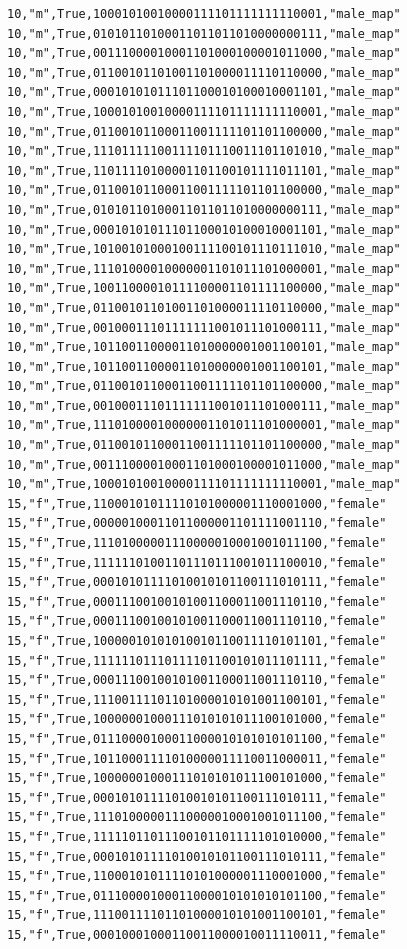 \documentclass[authoryearcitations]{UoYCSproject}
\begin{document}
\begin{framed}
\begin{verbatim}
10,"m",True,10001010010000111101111111110001,"male_map"
10,"m",True,01010110100011011011010000000111,"male_map"
10,"m",True,00111000010001101000100001011000,"male_map"
10,"m",True,01100101101001101000011110110000,"male_map"
10,"m",True,00010101011101100010100010001101,"male_map"
10,"m",True,10001010010000111101111111110001,"male_map"
10,"m",True,01100101100011001111101101100000,"male_map"
10,"m",True,11101111100111101110011101101010,"male_map"
10,"m",True,11011110100001101100101111011101,"male_map"
10,"m",True,01100101100011001111101101100000,"male_map"
10,"m",True,01010110100011011011010000000111,"male_map"
10,"m",True,00010101011101100010100010001101,"male_map"
10,"m",True,10100101000100111100101110111010,"male_map"
10,"m",True,11101000010000001101011101000001,"male_map"
10,"m",True,10011000010111100001101111100000,"male_map"
10,"m",True,01100101101001101000011110110000,"male_map"
10,"m",True,00100011101111111001011101000111,"male_map"
10,"m",True,10110011000011010000001001100101,"male_map"
10,"m",True,10110011000011010000001001100101,"male_map"
10,"m",True,01100101100011001111101101100000,"male_map"
10,"m",True,00100011101111111001011101000111,"male_map"
10,"m",True,11101000010000001101011101000001,"male_map"
10,"m",True,01100101100011001111101101100000,"male_map"
10,"m",True,00111000010001101000100001011000,"male_map"
10,"m",True,10001010010000111101111111110001,"male_map"
15,"f",True,11000101011110101000001110001000,"female"
15,"f",True,00000100011011000001101111001110,"female"
15,"f",True,11101000001110000010001001011100,"female"
15,"f",True,11111101001101110111001011100010,"female"
15,"f",True,00010101111010010101100111010111,"female"
15,"f",True,00011100100101001100011001110110,"female"
15,"f",True,00011100100101001100011001110110,"female"
15,"f",True,10000010101010010110011110101101,"female"
15,"f",True,11111101110111101100101011101111,"female"
15,"f",True,00011100100101001100011001110110,"female"
15,"f",True,11100111101101000010101001100101,"female"
15,"f",True,10000001000111010101011100101000,"female"
15,"f",True,01110000100011000010101010101100,"female"
15,"f",True,10110001111010000011110011000011,"female"
15,"f",True,10000001000111010101011100101000,"female"
15,"f",True,00010101111010010101100111010111,"female"
15,"f",True,11101000001110000010001001011100,"female"
15,"f",True,11111011011100101101111101010000,"female"
15,"f",True,00010101111010010101100111010111,"female"
15,"f",True,11000101011110101000001110001000,"female"
15,"f",True,01110000100011000010101010101100,"female"
15,"f",True,11100111101101000010101001100101,"female"
15,"f",True,00010001000110011000010011110011,"female"

\end{verbatim}
\end{framed}
\end{document}
